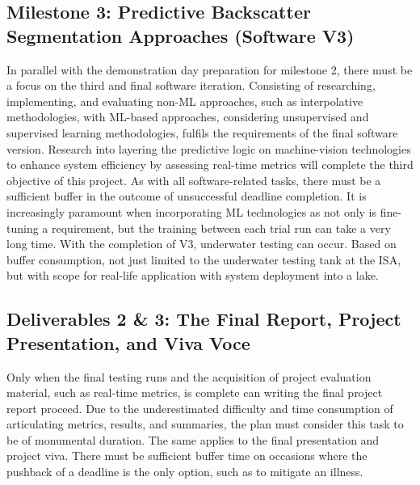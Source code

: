 \subsection{Milestone 3: Predictive Backscatter Segmentation Approaches (Software V3)}
In parallel with the demonstration day preparation for milestone 2, there must be a focus on the third and final software iteration. Consisting of researching, implementing, and evaluating non-ML approaches, such as interpolative methodologies, with ML-based approaches, considering unsupervised and supervised learning methodologies, fulfils the requirements of the final software version. Research into layering the predictive logic on machine-vision technologies to enhance system efficiency by assessing real-time metrics will complete the third objective of this project. As with all software-related tasks, there must be a sufficient buffer in the outcome of unsuccessful deadline completion. It is increasingly paramount when incorporating ML technologies as not only is fine-tuning a requirement, but the training between each trial run can take a very long time. With the completion of V3, underwater testing can occur. Based on buffer consumption, not just limited to the underwater testing tank at the ISA, but with scope for real-life application with system deployment into a lake.

\subsection{Deliverables 2 \& 3: The Final Report, Project Presentation, and Viva Voce}
Only when the final testing runs and the acquisition of project evaluation material, such as real-time metrics, is complete can writing the final project report proceed. Due to the underestimated difficulty and time consumption of articulating metrics, results, and summaries, the plan must consider this task to be of monumental duration. The same applies to the final presentation and project viva. There must be sufficient buffer time on occasions where the pushback of a deadline is the only option, such as to mitigate an illness.
